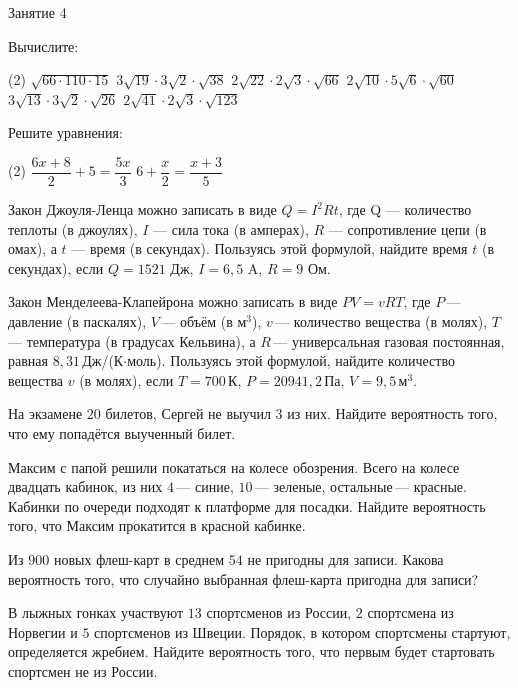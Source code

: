 \begin{class}[number=4]
	\begin{listofex}
		\item Занятие 4
	\end{listofex}
\end{class}

\begin{homework}[number=2]
	\begin{listofex}
		\item Вычислите:
		\begin{tasks}(2)
			\task \( \sqrt{66\cdot110\cdot15} \)
			\task \( 3\sqrt{19}\cdot3\sqrt{2}\cdot\sqrt{38} \)
			\task \( 2\sqrt{22}\cdot2\sqrt{3}\cdot\sqrt{66} \)
			\task \( 2\sqrt{10}\cdot5\sqrt{6}\cdot\sqrt{60} \)
			\task \( 3\sqrt{13}\cdot3\sqrt{2}\cdot\sqrt{26} \)
			\task \( 2\sqrt{41}\cdot2\sqrt{3}\cdot\sqrt{123} \)
		\end{tasks}
		\item Решите уравнения:
		\begin{tasks}(2)
			\task \( \dfrac{6x+8}{2}+5=\dfrac{5x}{3} \)
			\task \( 6+\dfrac{x}{2}=\dfrac{x+3}{5} \)
		\end{tasks}
		\item Закон Джоуля-Ленца можно записать в виде \( Q=I^2Rt \), где Q --- количество теплоты (в джоулях), \( I \) --- сила тока (в амперах), \( R \) --- сопротивление цепи (в омах), а \( t \) ---  время (в секундах). Пользуясь этой формулой, найдите время \( t \) (в секундах), если \( Q=1521 \)  Дж, \( I=6,5  \) A, \( R=9 \)  Ом.
		\item Закон Менделеева-Клапейрона можно записать в виде \( PV=vRT \), где \( P \) --- давление (в паскалях), \( V \) --- объём (в м\( ^3 \)), \( v \) --- количество вещества (в молях), \( T \) --- температура (в градусах Кельвина), а \( R \) --- универсальная газовая постоянная, равная \( 8,31 \) Дж/(К\( \cdot \)моль). Пользуясь этой формулой, найдите количество вещества \( v \) (в молях), если \( T=700 \) К, \( P=20 941,2 \) Па, \( V=9,5 \) м\( ^3 \).
		\item На экзамене \( 20 \) билетов, Сергей не выучил \( 3 \) из них. Найдите вероятность того, что ему попадётся выученный билет.
		\item Максим с папой решили покататься на колесе обозрения. Всего на колесе двадцать кабинок, из них \( 4 \) --- синие, \( 10 \) --- зеленые, остальные --- красные. Кабинки по очереди подходят к платформе для посадки. Найдите вероятность того, что Максим прокатится в красной кабинке.
		\item Из \( 900 \) новых флеш-карт в среднем \( 54 \) не пригодны для записи. Какова вероятность того, что случайно выбранная флеш-карта пригодна для записи?
		\item В лыжных гонках участвуют \( 13 \) спортсменов из России, \( 2 \) спортсмена из Норвегии и \( 5 \) спортсменов из Швеции. Порядок, в котором спортсмены стартуют, определяется жребием. Найдите вероятность того, что первым будет стартовать спортсмен не из России.
	\end{listofex}
\end{homework}

